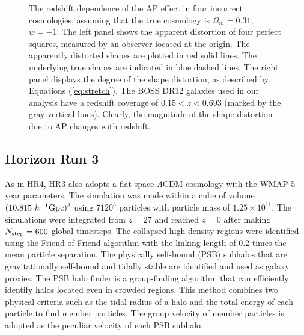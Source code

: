 \documentclass[iop]{emulateapj}
\newcommand{\hMsun}{{\ifmmode{h^{-1}{\rm
        {M_{\odot}}}}\else{$h^{-1}{\rm{M_{\odot}}}$~}\fi}}
\begin{document}
\begin{figure*}
   \caption{\label{fig_xy}
   The redshift dependence of the AP effect in four incorrect cosmologies,
   assuming that the true cosmology is $\Omega_m=0.31$, $w=-1$.
   The left panel shows the apparent distortion of four perfect squares,
   measured by an observer located at the origin.
   The apparently distorted shapes are plotted in red solid lines.
   The underlying true shapes are indicated in blue dashed lines.
   The right panel displays the degree of the shape distortion, as described by Equations (\ref{eq:stretch}).
   The BOSS DR12 galaxies used in our analysis have a redshift coverage of $0.15 < z < 0.693$ (marked 
   by the gray vertical lines). Clearly, the magnitude of the shape distortion due to AP changes with redshift.
   }
\end{figure*}



\subsection{Horizon Run 3}

As in HR4, HR3 also adopts a flat-space $\Lambda$CDM cosmology with the WMAP 5 year parameters.
The simulation was made within a cube of volume $(10.815\  h^{-1}{\rm{Gpc}})^3$
using $7120^3$ particles with particle mass of $1.25\times 10^{11}$\hMsun.
The simulations were integrated from $z=27$ and reached $z=0$ after making $N_{\rm step}=600$ global timesteps.
The collapsed high-density regions were identified using the Friend-of-Friend algorithm with the linking length of 0.2 times the mean particle separation.
The physically self-bound (PSB) subhalos that are gravitationally self-bound and tidally stable \citep{kim and park 2006} 
are identified and used as galaxy proxies.
The PSB halo finder is a group-finding algorithm that can efficiently identify halos located even in crowded regions. 
This method combines two physical criteria such as the tidal radius of a halo and the total energy of each particle to find member particles.
The group velocity of member particles is adopted as the peculiar velocity of each PSB subhalo.
\end{document}
